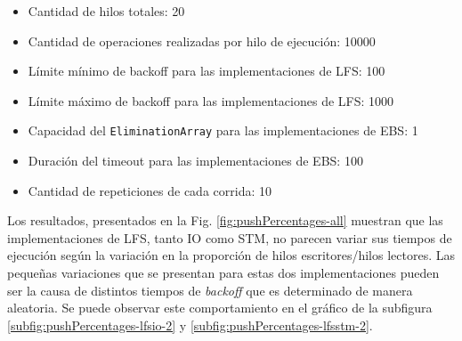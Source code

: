 \begin{itemize}
    \item Cantidad de hilos totales: 20
    \item Cantidad de operaciones realizadas por hilo de ejecución: 10000
    \item Límite mínimo de backoff para las implementaciones de LFS: 100
    \item Límite máximo de backoff para las implementaciones de LFS: 1000
    \item Capacidad del \texttt{EliminationArray} para las implementaciones de EBS: 1
    \item Duración del timeout para las implementaciones de EBS: 100
    \item Cantidad de repeticiones de cada corrida: 10
\end{itemize}

Los resultados, presentados en la Fig. \ref{fig:pushPercentages-all} muestran que las implementaciones de LFS, tanto IO como STM, no parecen variar sus tiempos de ejecución según la variación en la proporción de hilos escritores/hilos lectores.
Las pequeñas variaciones que se presentan para estas dos implementaciones pueden ser la causa de distintos tiempos de \emph{backoff} que es determinado de manera aleatoria. Se puede observar este comportamiento en el gráfico de la subfigura \ref{subfig:pushPercentages-lfsio-2} y \ref{subfig:pushPercentages-lfsstm-2}.

